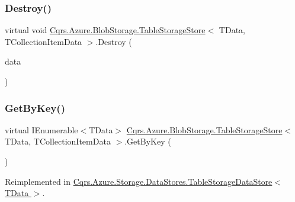 \subsubsection{\texorpdfstring{Destroy()}{Destroy()}\hspace{0.1cm}{\footnotesize\ttfamily [2/2]}}
{\footnotesize\ttfamily virtual void \hyperlink{classCqrs_1_1Azure_1_1BlobStorage_1_1TableStorageStore}{Cqrs.\+Azure.\+Blob\+Storage.\+Table\+Storage\+Store}$<$ T\+Data, T\+Collection\+Item\+Data $>$.Destroy (\begin{DoxyParamCaption}\item[{T\+Collection\+Item\+Data}]{data }\end{DoxyParamCaption})\hspace{0.3cm}{\ttfamily [virtual]}}

\mbox{\label{classCqrs_1_1Azure_1_1BlobStorage_1_1TableStorageStore_a7a6e253d7d4f6d40a2b59e804f68c5c4}} 
\subsubsection{\texorpdfstring{Get\+By\+Key()}{GetByKey()}}
{\footnotesize\ttfamily virtual I\+Enumerable$<$T\+Data$>$ \hyperlink{classCqrs_1_1Azure_1_1BlobStorage_1_1TableStorageStore}{Cqrs.\+Azure.\+Blob\+Storage.\+Table\+Storage\+Store}$<$ T\+Data, T\+Collection\+Item\+Data $>$.Get\+By\+Key (\begin{DoxyParamCaption}{ }\end{DoxyParamCaption})\hspace{0.3cm}{\ttfamily [virtual]}}



Reimplemented in \hyperlink{classCqrs_1_1Azure_1_1Storage_1_1DataStores_1_1TableStorageDataStore_a79043a9d497f4027cf87e5ff78fe6098}{Cqrs.\+Azure.\+Storage.\+Data\+Stores.\+Table\+Storage\+Data\+Store$<$ T\+Data $>$}.

\mbox{\label{classCqrs_1_1Azure_1_1BlobStorage_1_1TableStorageStore_ab7c4ae1a7b13e6bd1c36c242b753edba}} 
